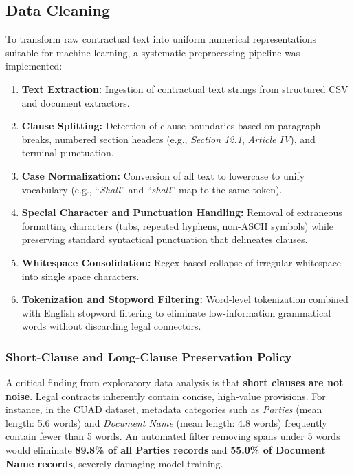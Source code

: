 \subsection{Data Cleaning}
\label{subsec:data_cleaning}
To transform raw contractual text into uniform numerical representations suitable for machine learning, a systematic preprocessing pipeline was implemented:
\begin{enumerate}
    \item \textbf{Text Extraction:} Ingestion of contractual text strings from structured CSV and document extractors.
    \item \textbf{Clause Splitting:} Detection of clause boundaries based on paragraph breaks, numbered section headers (e.g., \textit{Section 12.1}, \textit{Article IV}), and terminal punctuation.
    \item \textbf{Case Normalization:} Conversion of all text to lowercase to unify vocabulary (e.g., ``\textit{Shall}'' and ``\textit{shall}'' map to the same token).
    \item \textbf{Special Character and Punctuation Handling:} Removal of extraneous formatting characters (tabs, repeated hyphens, non-ASCII symbols) while preserving standard syntactical punctuation that delineates clauses.
    \item \textbf{Whitespace Consolidation:} Regex-based collapse of irregular whitespace into single space characters.
    \item \textbf{Tokenization and Stopword Filtering:} Word-level tokenization combined with English stopword filtering to eliminate low-information grammatical words without discarding legal connectors.
\end{enumerate}

\subsubsection*{Short-Clause and Long-Clause Preservation Policy}
A critical finding from exploratory data analysis is that \textbf{short clauses are not noise}. Legal contracts inherently contain concise, high-value provisions. For instance, in the CUAD dataset, metadata categories such as \textit{Parties} (mean length: 5.6 words) and \textit{Document Name} (mean length: 4.8 words) frequently contain fewer than 5 words. An automated filter removing spans under 5 words would eliminate \textbf{89.8\% of all Parties records} and \textbf{55.0\% of Document Name records}, severely damaging model training. 


